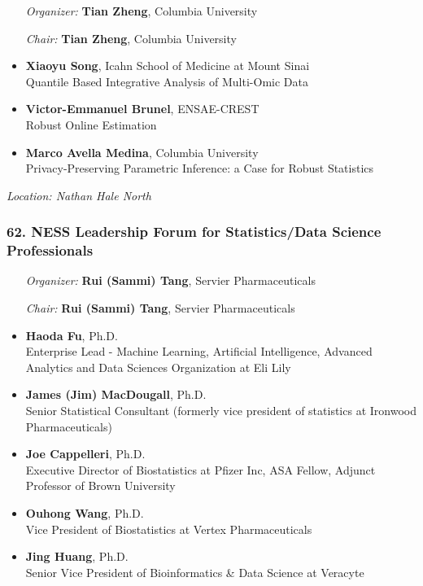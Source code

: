 \begin{enumerate}[align=left]
\item [\emph{Organizer:}] \textbf{Tian Zheng}, Columbia University
\item [\emph{Chair:}] \textbf{Tian Zheng}, Columbia University
\end{enumerate}

\begin{itemize}
\item \textbf{Xiaoyu Song}, Icahn School of Medicine at Mount Sinai \\
Quantile Based Integrative Analysis of Multi-Omic Data
\item \textbf{Victor-Emmanuel Brunel}, ENSAE-CREST \\
Robust Online Estimation
\item \textbf{Marco Avella Medina}, Columbia University \\
Privacy-Preserving Parametric Inference: a Case for Robust Statistics
\end{itemize}

\emph{Location: Nathan Hale North}

\subsubsection*{62. NESS Leadership Forum for Statistics/Data Science Professionals}

\begin{enumerate}[align=left]
\item [\emph{Organizer:}] \textbf{Rui (Sammi) Tang}, Servier Pharmaceuticals
\item [\emph{Chair:}] \textbf{Rui (Sammi) Tang},  Servier Pharmaceuticals
\end{enumerate}

\begin{itemize}
\item \textbf{Haoda Fu},  Ph.D. \\
 Enterprise Lead - Machine Learning, Artificial Intelligence, Advanced Analytics and Data Sciences Organization at Eli Lily
\item \textbf{James (Jim) MacDougall},  Ph.D. \\
 Senior Statistical Consultant (formerly vice president of statistics at Ironwood Pharmaceuticals)
\item \textbf{Joe Cappelleri},  Ph.D. \\
 Executive Director of Biostatistics at Pfizer Inc, ASA Fellow, Adjunct Professor of Brown University
\item \textbf{Ouhong Wang},  Ph.D. \\
 Vice President of Biostatistics at Vertex Pharmaceuticals
\item \textbf{Jing Huang},  Ph.D. \\
 Senior Vice President of Bioinformatics \& Data Science at Veracyte
\end{itemize}

